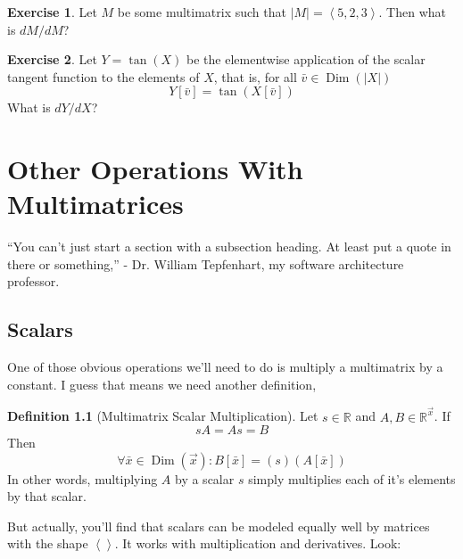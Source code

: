 \documentclass[12pt]{book}
\theoremstyle{plain}
\theoremstyle{definition}
\newtheorem{definition}{Definition}[chapter]
\newtheorem{exercise}{Exercise}[chapter]
\theoremstyle{ppart}
\theoremstyle{case}
\theoremstyle{solution}
\DeclareMathOperator{\Dim}{Dim}
\newcommand{\shape}[1]{\left|#1\right|}
\begin{document}
\begin{exercise}
Let $M$ be some multimatrix such that $\shape{M} = \left<5,2,3\right>$. Then what is
$dM/dM$?
\end{exercise}

\begin{exercise}
Let $Y = \tan(X)$ be the elementwise application of the scalar tangent function to
the elements of $X$, that is, for all $\bar{v} \in \Dim(\shape{X})$
\[ Y[\bar{v}] = \tan(X[\bar{v}]) \]
What is $dY/dX$?
\end{exercise}

\chapter{Other Operations With Multimatrices}

\begin{displayquote}
``You can't just start a section with a subsection heading. At least put a quote
in there or something,'' - Dr. William Tepfenhart, my software architecture professor.
\end{displayquote}

\section{Scalars}

One of those obvious operations we'll need to do is multiply
a multimatrix by a constant. I guess that means we need another definition,

\begin{definition}[Multimatrix Scalar Multiplication]
Let $s \in \mathbb{R}$ and $A, B \in \mathbb{R}^{\vec{x}}$. If
\[ sA = As = B \]
Then
\[ \forall \bar{x} \in \Dim(\vec{x}):
   B[\bar{x}] = (s)(A[\bar{x}]) \]
In other words, multiplying $A$ by a scalar $s$ simply multiplies each of
it's elements by that scalar.
\end{definition}

But actually, you'll find that scalars can be modeled equally well by matrices
with the shape $\left<\right>$. It works with multiplication and derivatives. Look:
\end{document}
